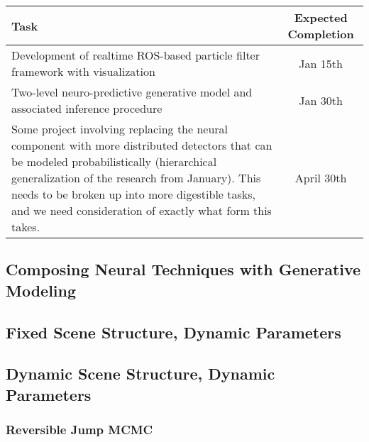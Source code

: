 \begin{table}
  \begin{tabularx}{\textwidth}{|X|c|}
    \hline
    \textbf{Task} & \textbf{Expected Completion} \\
    \hline
    Development of realtime ROS-based particle filter framework with visualization & Jan 15th \\
    \hline
    Two-level neuro-predictive generative model and associated inference procedure & Jan 30th \\
    \hline
    Some project involving replacing the neural component with more distributed detectors that can be modeled probabilistically (hierarchical generalization of the research from January). This needs to be broken up into more digestible tasks, and we need consideration of exactly what form this takes. & April 30th \\
    \hline
  \end{tabularx}
\end{table}


\subsection{Composing Neural Techniques with Generative Modeling}

\todo

\subsection{Fixed Scene Structure, Dynamic Parameters}

\todo

\subsection{Dynamic Scene Structure, Dynamic Parameters}

\todo

\subsubsection{Reversible Jump MCMC}

\todo

